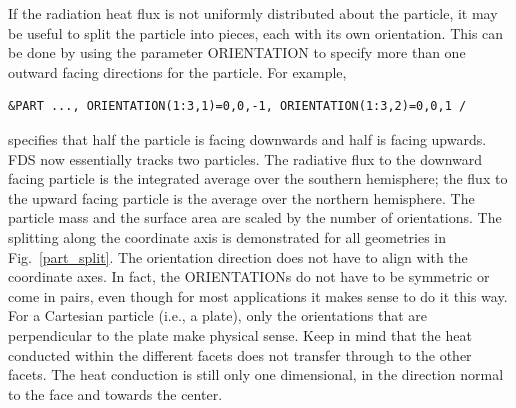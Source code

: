 \documentclass[11pt]{book}
\begin{document}
If the radiation heat flux is not uniformly distributed about the particle, it may be useful to split the particle into pieces, each with its own orientation. This can be done by using the parameter {\ct ORIENTATION} to specify  more than one outward facing directions for the particle. For example,
\begin{lstlisting}
&PART ..., ORIENTATION(1:3,1)=0,0,-1, ORIENTATION(1:3,2)=0,0,1 /
\end{lstlisting}
specifies that half the particle is facing downwards and half is facing upwards. FDS now essentially tracks two particles. The radiative flux to the downward facing particle is the integrated average over the southern hemisphere; the flux to the upward facing particle is the average over the northern hemisphere. The particle mass and the surface area are scaled by the number of orientations. The splitting along the coordinate axis is demonstrated for all geometries in Fig.~\ref{part_split}. The orientation direction does not have to align with the coordinate axes. In fact, the {\ct ORIENTATION}s do not have to be symmetric or come in pairs, even though for most applications it makes sense to do it this way. For a Cartesian particle (i.e., a plate), only the orientations that are perpendicular to the plate make physical sense. Keep in mind that the heat conducted within the different facets does not transfer through to the other facets. The heat conduction is still only one dimensional, in the direction normal to the face and towards the center.
\end{document}
